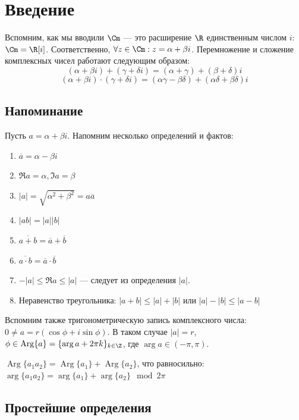 
\section{Введение}
Вспомним, как мы вводили \(\Cm\) --- это расширение \(\R\) единственным числом \(i\): \(\Cm = \R[i]\). Соответственно, \(\forall z \in \Cm: z = \alpha + \beta i\). Перемножение и сложение комплексных чисел работают следующим образом:
\[(\alpha + \beta i) + (\gamma + \delta i) = (\alpha + \gamma) + (\beta + \delta)i\]
\[(\alpha + \beta i) \cdot (\gamma + \delta i) = (\alpha \gamma - \beta \delta) + (\alpha \delta + \beta \delta)i\]
\subsection{Напоминание}
Пусть \(a = \alpha + \beta i\). Напомним несколько определений и фактов:
\begin{enumerate}
    \item \(\overline{a} = \alpha - \beta i\)
    \item \(\Re a = \alpha, \Im a = \beta\)
    \item \(|a| = \sqrt{\alpha^2 + \beta^2} = a\overline{a}\)
    \item \(|ab| = |a||b|\)
    \item \(\overline{a + b} = \overline{a} + \overline{b}\)
    \item \(\overline{a \cdot b} = \overline{a} \cdot \overline{b}\)
    \item \(-|a| \le \Re a \le |a|\) --- следует из определения \(|a|\).
    \item Неравенство треугольника: \(|a + b| \le |a| + |b|\) или \(|a| - |b| \le |a - b|\)
\end{enumerate}

Вспомним также тригонометрическую запись комплексного числа:
\(0 \ne a = r(\cos \phi + i \sin \phi)\). В таком случае \(|a| = r\), \(\phi \in \operatorname{Arg}\{a\} = \{\operatorname{arg}a + 2\pi k\}_{k \in \Z}\), где \(\operatorname{arg}a \in (-\pi, \pi)\).

\begin{exercise}
    \(\operatorname{Arg}\{a_1a_2\} = \operatorname{Arg}\{a_1\} + \operatorname{Arg}\{a_2\}\), что равносильно:
    \(\operatorname{arg}\{a_1a_2\} = \operatorname{arg}\{a_1\} + \operatorname{arg}\{a_2\} \mod 2\pi\)
\end{exercise}

\subsection{Простейшие определения}

